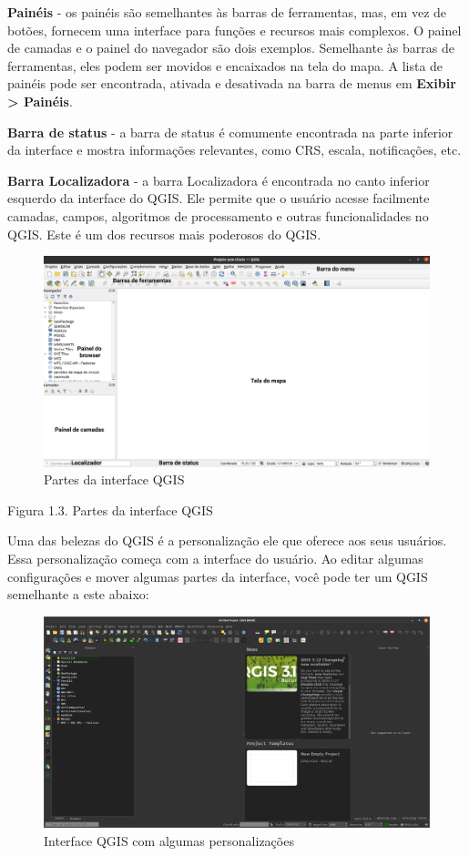 \documentclass[
]{krantz}
\begin{document}
\textbf{Painéis} - os painéis são semelhantes às barras de ferramentas, mas, em vez de botões, fornecem uma interface para funções e recursos mais complexos. O painel de camadas e o painel do navegador são dois exemplos. Semelhante às barras de ferramentas, eles podem ser movidos e encaixados na tela do mapa. A lista de painéis pode ser encontrada, ativada e desativada na barra de menus em \textbf{Exibir \textgreater{} Painéis}.

\textbf{Barra de status} - a barra de status é comumente encontrada na parte inferior da interface e mostra informações relevantes, como CRS, escala, notificações, etc.

\textbf{Barra Localizadora} - a barra Localizadora é encontrada no canto inferior esquerdo da interface do QGIS. Ele permite que o usuário acesse facilmente camadas, campos, algoritmos de processamento e outras funcionalidades no QGIS. Este é um dos recursos mais poderosos do QGIS.

\begin{figure}
\centering
\includegraphics{media/modulo1/qgis-interface-parts.png}
\caption{Partes da interface QGIS}
\end{figure}

Figura 1.3. Partes da interface QGIS

Uma das belezas do QGIS é a personalização ele que oferece aos seus usuários. Essa personalização começa com a interface do usuário. Ao editar algumas configurações e mover algumas partes da interface, você pode ter um QGIS semelhante a este abaixo:

\begin{figure}
\centering
\includegraphics{media/modulo1/qgis-interface-custom.png}
\caption{Interface QGIS com algumas personalizações}
\end{figure}
\end{document}

